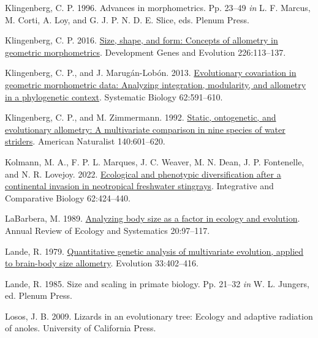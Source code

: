\documentclass[
  11pt,
]{article}
\newlength{\cslhangindent}
\newlength{\cslentryspacingunit} %
\newenvironment{CSLReferences}[2] %
 {%
  \setlength{\parindent}{0pt}
  \ifodd #1
  \let\oldpar\par
  \def\par{\hangindent=\cslhangindent\oldpar}
  \fi
  \setlength{\parskip}{#2\cslentryspacingunit}
 }%
 {}
\begin{document}
\begin{CSLReferences}{1}{0}
\leavevmode{}%
Klingenberg, C. P. 1996. Advances in morphometrics. Pp. 23--49 \emph{in}
L. F. Marcus, M. Corti, A. Loy, and G. J. P. N. D. E. Slice, eds. Plenum
Press.

\leavevmode{}%
Klingenberg, C. P. 2016.
\href{https://doi.org/10.1007/s00427-016-0539-2}{Size, shape, and form:
Concepts of allometry in geometric morphometrics}. Development Genes and
Evolution 226:113--137.

\leavevmode{}%
Klingenberg, C. P., and J. Marugán-Lobón. 2013.
\href{https://doi.org/10.1093/sysbio/syt025}{Evolutionary covariation in
geometric morphometric data: Analyzing integration, modularity, and
allometry in a phylogenetic context}. Systematic Biology 62:591--610.

\leavevmode{}%
Klingenberg, C. P., and M. Zimmermann. 1992.
\href{https://doi.org/10.1086/285430}{Static, ontogenetic, and
evolutionary allometry: A multivariate comparison in nine species of
water striders}. American Naturalist 140:601--620.

\leavevmode{}%
Kolmann, M. A., F. P. L. Marques, J. C. Weaver, M. N. Dean, J. P.
Fontenelle, and N. R. Lovejoy. 2022.
\href{https://doi.org/10.1093/icb/icac019}{Ecological and phenotypic
diversification after a continental invasion in neotropical freshwater
stingrays}. Integrative and Comparative Biology 62:424--440.

\leavevmode{}%
LaBarbera, M. 1989.
\href{https://doi.org/10.1146/annurev.es.20.110189.000525}{Analyzing
body size as a factor in ecology and evolution}. Annual Review of
Ecology and Systematics 20:97--117.

\leavevmode{}%
Lande, R. 1979. \href{https://doi.org/10.2307/2407630}{Quantitative
genetic analysis of multivariate evolution, applied to brain-body size
allometry}. Evolution 33:402--416.

\leavevmode{}%
Lande, R. 1985. Size and scaling in primate biology. Pp. 21--32
\emph{in} W. L. Jungers, ed. Plenum Press.

\leavevmode{}%
Losos, J. B. 2009. Lizards in an evolutionary tree: Ecology and adaptive
radiation of anoles. University of California Press.


\end{CSLReferences}
\end{document}

